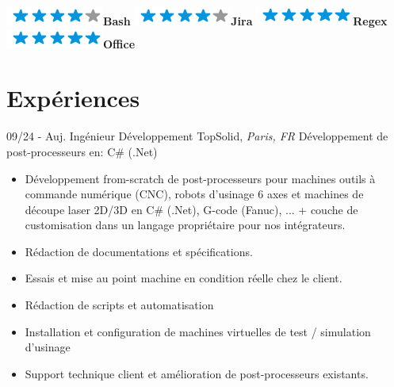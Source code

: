 \documentclass[]{friggeri-cv}
\begin{document}
\begin{flushleft}
\begin{multicols}{3}
\begin{itemize}
\begin{flushleft}
\includegraphics[scale=0.40]{res/img/4stars.png}\hspace{1.5mm}\textbf{Bash}
\includegraphics[scale=0.40]{res/img/4stars.png}\hspace{1.5mm}\textbf{Jira}
\includegraphics[scale=0.40]{res/img/5stars.png}\hspace{1.5mm}\textbf{Regex}
\includegraphics[scale=0.40]{res/img/5stars.png}\hspace{1.5mm}\textbf{Office}
\end{flushleft}            


        \end{itemize}
        \end{multicols}
        \end{flushleft} \normalsize
        \vspace*{-0.65cm}
\section{Expériences}
\vspace*{-0.25cm}

\begin{entrylist}
  \entry
    {09/24 - Auj.}
    {Ingénieur Développement}
    {TopSolid, \textit{Paris, FR}}
    {Développement de post-processeurs en:  C\# (.Net)}
\end{entrylist}
\vspace{-15pt}

\vspace{0.5mm}
\begin{itemize}
\setlength{\itemsep}{1pt}
\setlength{\parskip}{0pt}
\setlength{\parsep}{0pt}

\item Développement from-scratch de post-processeurs pour machines outils à commande numérique (CNC), robots d'usinage 6 axes et machines de découpe laser 2D/3D en C\# (.Net), G-code (Fanuc), ... + couche de customisation dans un langage propriétaire pour nos intégrateurs.
\item Rédaction de documentations et spécifications.
\item Essais et mise au point machine en condition réelle chez le client.
\item Rédaction de scripts et automatisation
\item Installation et configuration de machines virtuelles de test / simulation d'usinage
\item Support technique client et amélioration de post-processeurs existants.
\end{itemize}
\end{document}
